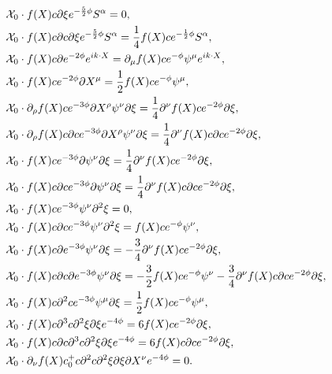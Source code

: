 \documentclass[12pt]{article}
\numberwithin{equation}{section}
\begin{document}
\begin{equation}
{\begin{align}
\label{PCO8}
&{\cal X}_0 \cdot f(X) c \partial \xi e^{-\frac52 \phi}S^\alpha   = 0,\\
\label{PCO9}
&{\cal X}_0 \cdot f(X) c \partial c \partial \xi e^{-\frac52 \phi}S^\alpha   = \frac{1}{4} f(X)c e^{-\frac12\phi}S^\alpha,\\
\label{PCO10}
& {\cal{X}}_0 \cdot f(X) c \partial e^{-2\phi} e^{i k \cdot X} = \partial_\mu f(X) c e^{-\phi} \psi^\mu e^{i k \cdot X}, \\
\label{PCO11}
& \mathcal{X}_0 \cdot f(X) c e^{-2\phi}\partial X^\mu = \frac{1}{2} f(X)c e^{-\phi}\psi^\mu, \\
\label{PCO12}
& \mathcal{X}_0 \cdot \partial_\rho f(X) c e^{-3\phi}  \partial X^\rho \psi^\nu \partial \xi =  \frac{1}{4} \partial^\nu f(X) c e^{-2\phi} \partial \xi, \\
\label{PCO13}
&  \mathcal{X}_0\cdot \partial_\rho f(X) c \partial c e^{-3 \phi}\partial X^\rho \psi^\nu \partial\xi = \frac{1}{4} \partial^\nu f(X) c \partial c e^{-2\phi}\partial \xi, \\
\label{PCO14}
&  \mathcal{X}_0  \cdot f(X) c e^{-3\phi} \partial \psi^\nu \partial \xi = \frac{1}{4} \partial^\nu f(X) c e^{-2\phi}\partial\xi, \\
\label{PCO15}
&  \mathcal{X}_0  \cdot f(X) c \partial c e^{-3 \phi}\partial \psi^\nu \partial \xi = \frac{1}{4}\partial^\nu f(X) c\partial c e^{-2\phi}\partial\xi, \\
\label{PCO16}
&  \mathcal{X}_0 \cdot  f(X) c e^{-3 \phi} \psi^\nu \partial^2 \xi = 0, \\
\label{PCO17}
&  \mathcal{X}_0 \cdot f(X) c \partial c e^{-3\phi} \psi^\nu \partial^2 \xi =f(X) c e^{-\phi}\psi^\nu, \\
\label{PCO18}
&  \mathcal{X}_0 \cdot f(X) c \partial e^{-3\phi}\psi^\nu \partial\xi = - \frac{3}{4}
\partial^\nu f(X) c e^{-2\phi}\partial \xi, \\
\label{PCO19}
&  \mathcal{X}_0  \cdot f(X) c \partial c \partial e^{-3 \phi} \psi^\nu \partial \xi = -\frac{3}{2} f(X) c e^{-\phi} \psi^\nu - \frac{3}{4} \partial^\nu f(X) c \partial c e^{-2 \phi}\partial \xi, \\
\label{PCO20}
& \mathcal{X}_0 \cdot f(X) c \partial^2 c e^{-3 \phi} \psi^\mu \partial \xi = \frac{1}{2}f(X) c e^{-\phi}\psi ^\mu, \\
\label{PCO21}
& \mathcal{X}_0 \cdot  f(X) c \partial^3 c \partial^2 \xi \partial \xi  e^{-4 \phi} = 6 f(X) c e^{-2 \phi}\partial \xi, \\
\label{PCO22}
& \mathcal{X}_0 \cdot  f(X) c \partial c \partial^3 c \partial^2 \xi \partial \xi  e^{-4 \phi} = 6 f(X) c \partial c e^{-2 \phi} \partial \xi, \\
\label{PCO23}
   & \mathcal{X}_0 \cdot \partial_\nu f(X) c_0^+ c  \partial^2 c \partial^2 \xi \partial \xi \partial X^\nu e^{-4 \phi} = 0.
\end{align}
}



\end{equation}
\end{document}
